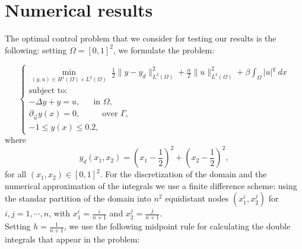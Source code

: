 \documentclass[11pt,a4paper]{amsart}
\newcommand{\om}{\Omega}
\newcommand{\norm}[1]{\lVert #1 \rVert}
\begin{document}
\section{Numerical results}

The optimal control problem that we consider for testing our results is the following: setting $\om=[0,1]^2$, we formulate the problem:

\begin{equation}
    \begin{cases}
    \displaystyle\min_{(y,u)\in H^1(\om)\times L^2(\om)}\; \frac{1}{2}\norm{y-y_d}^2_{L^2(\om)}+\frac{\alpha}{2}\norm{u}^2_{L^2(\om)}+\beta \int_{\om} |u|^{q}\; dx\\
    \mbox{subject to:}\\
    -\Delta y+y=u, \phantom{aaa} \mbox{in } \om,\\
    \partial_{\Vec{n}}y(x)=0, \phantom{aaaaa} \mbox{over } \Gamma,\\    
    -1\le y(x)\le 0.2 ,
    \end{cases}
\end{equation}
where 
\[
    y_d(x_1,x_2)=\left(x_1-\frac{1}{2}\right)^2+\left(x_2-\frac{1}{2}\right)^2,
\]
for all $(x_1,x_2)\in [0,1]^2$. For the discretization of the domain and the numerical approximation of the integrals we use a finite difference scheme: using the standar partition of the domain into $n^2$ equidistant nodes $(x_1^i,x_2^j)$ for $i,j=1,\cdots,n$, with $x_1^i=\frac{i}{n+1}$ and $x_2^j=\frac{j}{n+1}$.\\

Setting $h=\frac{1}{n+1}$, we use the following midpoint rule for calculating the double integrals that appear in the problem:
\end{document}
